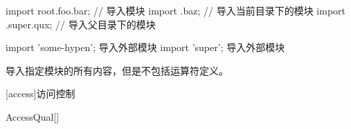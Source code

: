 \enterexample
\begin{codeblock}
import root.foo.bar; // 导入模块
import .baz; // 导入当前目录下的模块
import .super.qux; // 导入父目录下的模块

import 'some-hypen'; 导入外部模块
import 'super'; 导入外部模块
\end{codeblock}
\exitexample

\pnum
\tcode{*}导入指定模块的所有内容，但是不包括运算符定义。

[access]{访问控制}

\begin{bnf}{AccessQual}[\oneof]
\end{bnf}